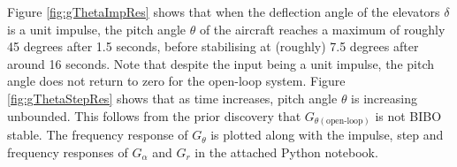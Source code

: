 \documentclass[10pt,a4paper]{article}
\begin{document}
    Figure \ref{fig:gThetaImpRes} shows that when the deflection angle of the elevators $\delta$ is a unit impulse, the pitch angle $\theta$ of the aircraft reaches a maximum of roughly 45 degrees after 1.5 seconds, before stabilising at (roughly) 7.5 degrees after around 16 seconds. Note that despite the input being a unit impulse, the pitch angle does not return to zero for the open-loop system.    Figure \ref{fig:gThetaStepRes} shows that as time increases, pitch angle $\theta$ is increasing unbounded. This follows from the prior discovery that $G_{\theta(\text{open-loop})}$ is not BIBO stable. The frequency response of $G_\theta$ is plotted along with the impulse, step and frequency responses of $G_\alpha$ and $G_r$ in the attached Python notebook.    
\end{document}
